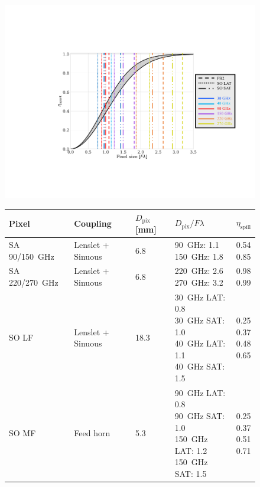 \begin{figure}[!t]
    \centering
    \includegraphics[width=\linewidth, trim=5cm 4cm 1cm 5cm, clip]{InstrumentOverview/Figures/aperture_eff_pix_sizes.pdf}
    \begin{tabular}{m{3.5cm}|m{3.5cm}|m{2cm}|m{3.5cm}|m{0.7cm}}
         Pixel & Coupling & $D_{\mathrm{pix}}$ [mm] & $D_{\mathrm{pix}} / F \lambda$ & $\eta_{\mathrm{spill}}$ \\
         \hline
         \hline
         SA 90/150~GHz & Lenslet + Sinuous & 6.8 & \shortstack{90~GHz: 1.1 \\ 150~GHz: 1.8} & \shortstack{0.54 \\ 0.85} \\
         \hline
         SA 220/270~GHz & Lenslet + Sinuous & 6.8 & \shortstack{220~GHz: 2.6 \\ 270~GHz: 3.2} & \shortstack{0.98 \\ 0.99} \\
         \hline
         SO LF & Lenslet + Sinuous & 18.3 & \shortstack{30~GHz LAT: 0.8 \\ 30~GHz SAT: 1.0 \\ 40~GHz LAT: 1.1 \\ 40~GHz SAT: 1.5} & \shortstack{0.25 \\ 0.37 \\ 0.48 \\ 0.65}\\
         \hline
         SO MF & Feed horn & 5.3 & \shortstack{90~GHz LAT: 0.8 \\ 90~GHz SAT: 1.0 \\ 150~GHz LAT: 1.2 \\ 150~GHz SAT: 1.5} & \shortstack{0.25 \\ 0.37 \\ 0.51 \\ 0.71} \\

\end{tabular}
\end{figure}
